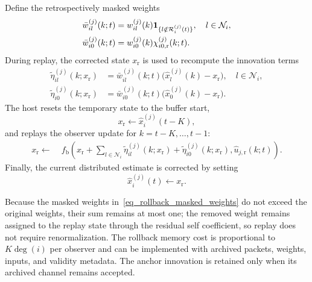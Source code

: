 \documentclass[letterpaper,journal]{IEEEtran}
\def\N{\mathcal{N}} %
\begin{document}
Define the retrospectively masked weights
\begin{align}
\bar w_{il}^{(j)}(k;t)
&=w_{il}^{(j)}(k)\mathbf 1_{\{l\notin\mathcal R_i^{(j)}(t)\}},\quad l\in\N_i,\notag\\
\bar w_{i0}^{(j)}(k;t)
&=w_{i0}^{(j)}(k)\chi_{i0,\mathrm r}^{(j)}(k;t).
\label{eq_rollback_masked_weights}
\end{align}
During replay, the corrected state $x_{\mathrm{r}}$ is used to recompute the innovation terms
\begin{align}
\tilde{\eta}_{il}^{(j)}(k;x_{\mathrm{r}})
&= \bar w_{il}^{(j)}(k;t)
\big(\hat{x}_l^{(j)}(k)-x_{\mathrm{r}}\big),\quad l\in\N_i, \\
\tilde{\eta}_{i0}^{(j)}(k;x_{\mathrm{r}})
&= \bar w_{i0}^{(j)}(k;t)
\big(\hat{x}_0^{(j)}(k)-x_{\mathrm{r}}\big).
\end{align}
The host resets the temporary state to the buffer start,
\begin{equation}
    x_{\mathrm{r}} \leftarrow \hat{x}_i^{(j)}(t-K),
\end{equation}
and replays the observer update for $k=t-K,\ldots,t-1$:
\begin{equation}
\begin{aligned}
x_{\mathrm{r}} \leftarrow\;&
f_{\text{b}}\!\left(
x_{\mathrm{r}}
+\sum_{l\in\N_i}\tilde{\eta}_{il}^{(j)}(k;x_{\mathrm{r}})
+ \tilde{\eta}_{i0}^{(j)}(k;x_{\mathrm{r}}),
\hat{u}_{j,\mathrm r}(k;t)\right).
\end{aligned}
\label{eq_rollback_replay}
\end{equation}
Finally, the current distributed estimate is corrected by setting
\begin{equation}
    \hat{x}_i^{(j)}(t)\leftarrow x_{\mathrm{r}}.
\end{equation}

Because the masked weights in~\eqref{eq_rollback_masked_weights} do not exceed the original weights, their sum remains at most one; the removed weight remains assigned to the replay state through the residual self coefficient, so replay does not require renormalization. The rollback memory cost is proportional to $K\deg(i)$ per observer and can be implemented with archived packets, weights, inputs, and validity metadata. The anchor innovation is retained only when its archived channel remains accepted.
\end{document}
